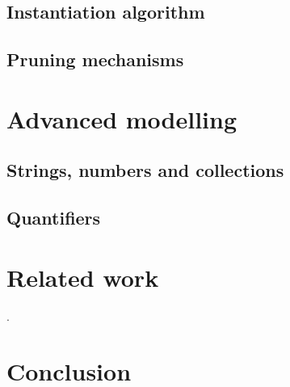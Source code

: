 
\subsection{Instantiation algorithm}

\subsection{Pruning mechanisms}

\section{Advanced modelling}
\label{sec:amodelling}

\subsection{Strings, numbers and collections}

\subsection{Quantifiers}

\section{Related work}
\label{sec:relatedwork}

. 

\section{Conclusion}

